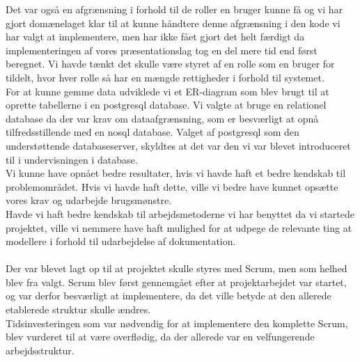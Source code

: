 Det var også en afgrænsning i forhold til de roller en bruger kunne få og vi har gjort domænelaget klar til at kunne håndtere denne afgrænsning i den kode vi har valgt at implementere, men har ikke fået gjort det helt færdigt da implementeringen af vores præsentationslag tog en del mere tid end først beregnet. Vi havde tænkt det skulle være styret af en rolle som en bruger for tildelt, hvor hver rolle så har en mængde rettigheder i forhold til systemet.\\
For at kunne gemme data udviklede vi et ER-diagram som blev brugt til at oprette tabellerne i en postgresql database. Vi valgte at bruge en relationel database da der var krav om dataafgrænsning, som er besværligt at opnå tilfredsstillende med en nosql database. Valget af postgresql som den understøttende databaseserver, skyldtes at det var den vi var blevet introduceret til i undervisningen i database.\\
Vi kunne have opnået bedre resultater, hvis vi havde haft et bedre kendskab til problemområdet. Hvis vi havde haft dette, ville vi bedre have kunnet opsætte vores krav og udarbejde brugsmønstre.\\
Havde vi haft bedre kendskab til arbejdsmetoderne vi har benyttet da vi startede projektet, ville vi nemmere have haft mulighed for at udpege de relevante ting at modellere i forhold til udarbejdelse af dokumentation.\\
\\
Der var blevet lagt op til at projektet skulle styres med Scrum, men som helhed blev fra valgt. Scrum blev først gennemgået efter at projektarbejdet var startet, og var derfor besværligt at implementere, da det ville betyde at den allerede etablerede struktur skulle ændres. \\
Tidsinvesteringen som var nødvendig for at implementere den komplette Scrum, blev vurderet til at være overflødig, da der allerede var en velfungerende arbejdsstruktur. \\
